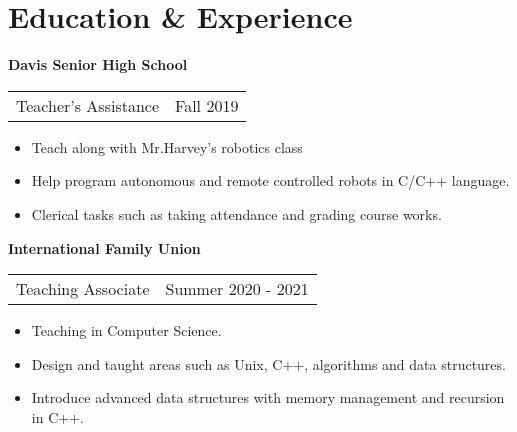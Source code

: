 \section{\sc Education \& Experience}
{\bf{Davis Senior High School}}\\
\begin{tabular}{@{}p{4in}p{2in}}
Teacher's Assistance & Fall 2019\\
\end{tabular}
\begin{itemize}
\setlength\itemsep{0em}
\item Teach along with Mr.Harvey's robotics class
\item Help program autonomous and remote controlled robots in C/C++ language.
\item Clerical tasks such as taking attendance and grading course works. 
\end{itemize}
{\bf{International Family Union}}\\
\begin{tabular}{@{}p{4in}p{2in}}
Teaching Associate & Summer 2020 - 2021\\
\end{tabular}
\begin{itemize}
\setlength\itemsep{0em}
\item Teaching in Computer Science.
\item Design and taught areas such as Unix, C++, algorithms and data structures.
\item Introduce advanced data structures with memory management and recursion in C++. 
\end{itemize}
\endinput